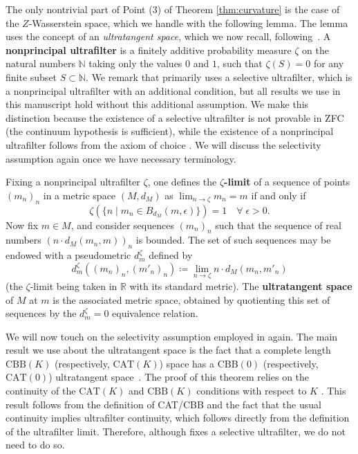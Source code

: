 \documentclass{article}
\theoremstyle{definition}
\newcommand{\R}{\mathbb{R}}
\begin{document}
The only nontrivial part of Point (3) of Theorem \ref{thm:curvature} is the case of the $Z$-Wasserstein space, which we handle with the following lemma. The lemma uses the concept of an \emph{ultratangent space}, which we now recall, following~\cite[Chapter 13.A]{alexander2024alexandrov}. A \textbf{nonprincipal ultrafilter} is a finitely additive probability measure $\zeta$ on the natural numbers $\mathbb{N}$ taking only the values $0$ and $1$, such that $\zeta(S) = 0$ for any finite subset $S \subset \mathbb{N}$. 
We remark that \cite{alexander2024alexandrov} primarily uses a selective ultrafilter, which is a nonprincipal ultrafilter with an additional condition, but all results we use in this manuscript hold without this additional assumption. We make this distinction because the existence of a selective ultrafilter is not provable in ZFC (the continuum hypothesis is sufficient), while the existence of a nonprincipal ultrafilter follows from the axiom of choice \cite[p. 44] {alexander2024alexandrov}. We will discuss the selectivity assumption again once we have necessary terminology. 
%
%
%
%
%
%

%
%
%
%
%
%
%
%

%
%
%
%
%
%

%
%
%
%
%
%
%
%
%
%
%
%

Fixing a nonprincipal ultrafilter $\zeta$, one defines the \textbf{$\zeta$-limit} of a sequence of points $(m_n)_n$ in a metric space $(M,d_M)$ as $\lim_{n \to \zeta} m_n = m$ if and only if 
\[
\zeta\left(\{n \mid m_n \in  B_{d_M}(m,\epsilon)\}\right) = 1 \quad \forall \; \epsilon > 0.
\]
Now fix $m \in M$, and consider sequences $(m_n)_n$ such that the sequence of real numbers $(n \cdot d_M(m_n,m))_n$ is bounded. The set of such sequences may be endowed with a pseudometric $d^\zeta_m$ defined by 
\[
d^\zeta_m((m_n)_n,(m'_n)_n) \coloneqq \lim_{n \to \zeta} n \cdot d_M(m_n,m'_n)
\]
(the $\zeta$-limit being taken in $\R$ with its standard metric). The \textbf{ultratangent space} of $M$ at $m$ is the associated metric space, obtained by quotienting this set of sequences by the $d_m^\zeta = 0$ equivalence relation. 

We will now touch on the selectivity assumption employed in \cite{alexander2024alexandrov} again. The main result we use about the ultratangent space is the fact that a complete length $\mathrm{CBB}(K)$ (respectively, $\mathrm{CAT}(K)$) space has a $\mathrm{CBB}(0)$  (respectively, $\mathrm{CAT}(0)$) ultratangent space~\cite[Theorem 13.1]{alexander2024alexandrov}. The proof of this theorem relies on the continuity of the $\mathrm{CAT}(K)$ and $\mathrm{CBB}(K)$ conditions with respect to $K$
\cite[Proposition 8.4, 9.7]{alexander2024alexandrov}. This result follows from the definition of CAT/CBB and the fact that the usual continuity implies ultrafilter continuity, which follows directly from the definition of the ultrafilter limit. Therefore, although \cite{alexander2024alexandrov} fixes a selective ultrafilter, we do not need to do so.
\end{document}
